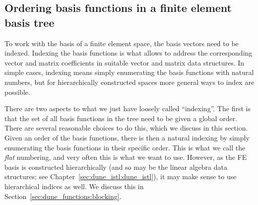 \documentclass[a4paper,10pt,headings=normal,bibliography=totoc]{scrartcl}
\begin{document}
\subsection{Ordering basis functions in a finite element basis tree}
\label{sec:dune_functions:basis_ordering}

To work with the basis of a finite element space, the basis vectors need to be indexed.  Indexing the basis functions
is what allows to address the corresponding vector and matrix coefficients in suitable vector and matrix data structures.
In simple cases, indexing means simply enumerating the basis functions with natural numbers, but for hierarchically
constructed spaces more general ways to index are possible.

There are two aspects to what we just have loosely called ``indexing''.  The first is that the set of all basis functions
in the tree need to be given a global order.  There are several reasonable choices to do this, which we discuss
in this section.
Given an order of the basis functions, there is then a natural indexing by simply enumerating the basis functions in
their specific order.
This is what we call the {\em flat} numbering, and very often this is what we want to use.  However, as the FE basis
is constructed hierarchically (and so may be the linear algebra data structures; see Chapter~\ref{sec:dune_istl:dune_istl}),
it may make sense to use hierarchical indices as well.  We discuss this in Section~\ref{sec:dune_functions:blocking}.
\end{document}
